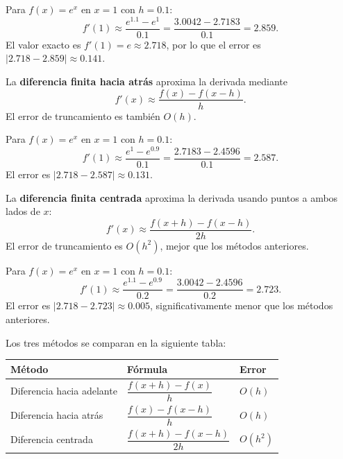 \documentclass[a4,11pt]{aleph-notas}
\begin{document}
\begin{ejem}
    Para $f(x)=e^x$ en $x=1$ con $h=0.1$:
    \[
        f'(1)\approx\frac{e^{1.1}-e^{1}}{0.1}=\frac{3.0042-2.7183}{0.1}=2.859.
    \]
    El valor exacto es $f'(1)=e\approx 2.718$, por lo que el error es $|2.718-2.859|\approx 0.141$.
\end{ejem}

\begin{defi}
    La \textbf{diferencia finita hacia atrás} aproxima la derivada mediante
    \[
        f'(x)\approx\frac{f(x)-f(x-h)}{h}.
    \]
    El error de truncamiento es también $O(h)$.
\end{defi}

\begin{ejem}
    Para $f(x)=e^x$ en $x=1$ con $h=0.1$:
    \[
        f'(1)\approx\frac{e^{1}-e^{0.9}}{0.1}=\frac{2.7183-2.4596}{0.1}=2.587.
    \]
    El error es $|2.718-2.587|\approx 0.131$.
\end{ejem}

\begin{defi}
    La \textbf{diferencia finita centrada} aproxima la derivada usando puntos a ambos lados de $x$:
    \[
        f'(x)\approx\frac{f(x+h)-f(x-h)}{2h}.
    \]
    El error de truncamiento es $O(h^2)$, mejor que los métodos anteriores.
\end{defi}

\begin{ejem}
    Para $f(x)=e^x$ en $x=1$ con $h=0.1$:
    \[
        f'(1)\approx\frac{e^{1.1}-e^{0.9}}{0.2}=\frac{3.0042-2.4596}{0.2}=2.723.
    \]
    El error es $|2.718-2.723|\approx 0.005$, significativamente menor que los métodos anteriores.
\end{ejem}

Los tres métodos se comparan en la siguiente tabla:

\begin{center}
\small
\begin{tabular}{p{}p{}p{}}
\toprule
Método & Fórmula & Error \\
\midrule
Diferencia hacia adelante & $\dfrac{f(x+h)-f(x)}{h}$ & $O(h)$ \\[4mm]
Diferencia hacia atrás & $\dfrac{f(x)-f(x-h)}{h}$ & $O(h)$ \\[4mm]
Diferencia centrada & $\dfrac{f(x+h)-f(x-h)}{2h}$ & $O(h^2)$ \\[2mm]
\bottomrule
\end{tabular}
\end{center}
\end{document}
